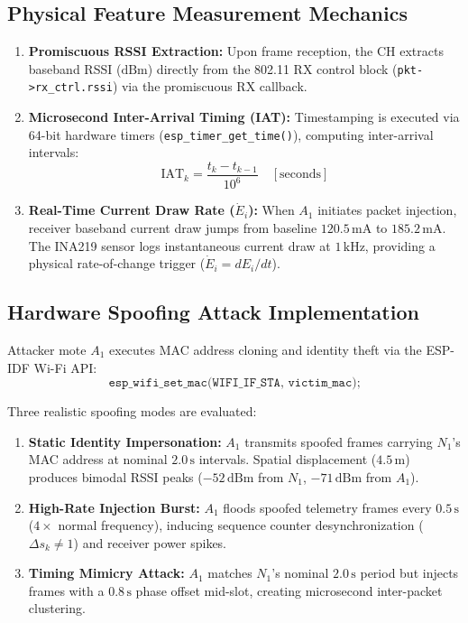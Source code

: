 \subsection{Physical Feature Measurement Mechanics}
\begin{enumerate}
    \item \textbf{Promiscuous RSSI Extraction:} Upon frame reception, the CH extracts baseband \ac{RSSI} ($\text{dBm}$) directly from the 802.11 RX control block (\texttt{pkt->rx\_ctrl.rssi}) via the promiscuous RX callback.
    \item \textbf{Microsecond Inter-Arrival Timing (IAT):} Timestamping is executed via 64-bit hardware timers (\texttt{esp\_timer\_get\_time()}), computing inter-arrival intervals:
    \begin{equation}
        \text{IAT}_k = \frac{t_k - t_{k-1}}{10^6} \quad [\text{seconds}]
    \end{equation}
    \item \textbf{Real-Time Current Draw Rate ($\dot{E}_i$):} When $A_1$ initiates packet injection, receiver baseband current draw jumps from baseline $120.5\,\text{mA}$ to $185.2\,\text{mA}$. The INA219 sensor logs instantaneous current draw at $1\,\text{kHz}$, providing a physical rate-of-change trigger ($\dot{E}_i = dE_i/dt$).
\end{enumerate}

\subsection{Hardware Spoofing Attack Implementation}
Attacker mote $A_1$ executes MAC address cloning and identity theft via the ESP-IDF Wi-Fi API:
\begin{equation}
    \texttt{esp\_wifi\_set\_mac(WIFI\_IF\_STA, victim\_mac);}
\end{equation}

Three realistic spoofing modes are evaluated:
\begin{enumerate}
    \item \textbf{Static Identity Impersonation:} $A_1$ transmits spoofed frames carrying $N_1$'s MAC address at nominal $2.0\,\text{s}$ intervals. Spatial displacement ($4.5\,\text{m}$) produces bimodal RSSI peaks ($-52\,\text{dBm}$ from $N_1$, $-71\,\text{dBm}$ from $A_1$).
    \item \textbf{High-Rate Injection Burst:} $A_1$ floods spoofed telemetry frames every $0.5\,\text{s}$ ($4\times$ normal frequency), inducing sequence counter desynchronization ($\Delta s_k \neq 1$) and receiver power spikes.
    \item \textbf{Timing Mimicry Attack:} $A_1$ matches $N_1$'s nominal $2.0\,\text{s}$ period but injects frames with a $0.8\,\text{s}$ phase offset mid-slot, creating microsecond inter-packet clustering.
\end{enumerate}

